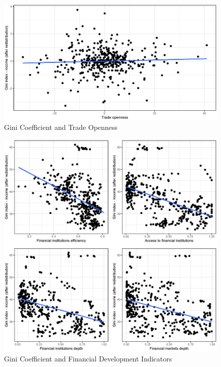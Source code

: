 \documentclass[a4paper,11pt]{article}
\begin{document}
\begin{figure}
    \caption{Gini Coefficient and Trade Openness}
    \label{fig:ginitrade}
\includegraphics[width=\textwidth, keepaspectratio]{figures/TradeOpenGiniNet}
\end{figure}

\begin{figure}
    \caption{Gini Coefficient and Financial Development Indicators}
\includegraphics[width=\textwidth, keepaspectratio]{figures/plots_findev_gini}
\end{figure}

%
%
\end{document}

